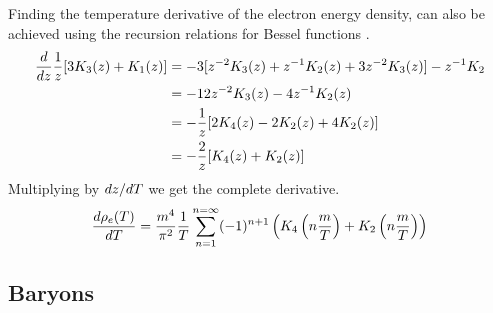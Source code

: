 Finding the temperature derivative of the electron energy density, can also be achieved using the recursion relations for Bessel functions \cite[\href{https://dlmf.nist.gov/10.29.E2}{(10.29.2)}]{NIST:DLMF}.
\begin{align}
    \frac{d}{dz} \frac{1}{z}[3K_{3}(z)+K_{1}(z)]&=-3[z^{-2} K_{3}(z)+z^{-1} K_{2}(z)+ 3z^{-2} K_{3}(z)]-z^{-1} K_{2}\\
    &=-12 z^{-2} K_{3}(z)-4z^{-1} K_{2}(z)\\
    &=-\frac{1}{z}[2K_{4}(z)-2K_{2}(z)+4 K_{2}(z)]\\
    &=-\frac{2}{z}[K_{4}(z)+K_{2}(z)]
\end{align}
Multiplying by $dz/dT$ we get the complete derivative.
\begin{align}
    \frac{d\rho_e(T)}{dT}=\frac{m^4}{\pi^2} \frac{1}{T} \sum_{n=1}^{n=\infty} (-1)^{n+1}   \left(K_4\left(n\frac{m }{T}\right) + K_2\left(n\frac{m }{T}\right) \right)
\end{align}


\subsection{Baryons}






